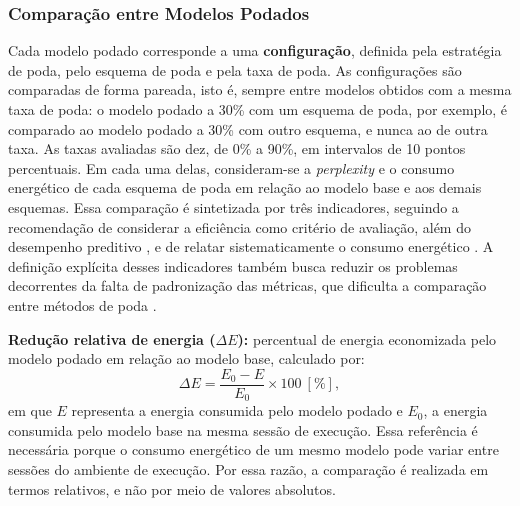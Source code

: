 \subsubsection{Comparação entre Modelos Podados}

Cada modelo podado corresponde a uma \textbf{configuração}, definida pela estratégia de
poda, pelo esquema de poda e pela taxa de poda. As
configurações são comparadas de forma pareada, isto é, sempre entre modelos obtidos com a
mesma taxa de poda: o modelo podado a 30\% com um esquema de poda, por exemplo, é comparado
ao modelo podado a 30\% com outro esquema, e nunca ao de outra taxa. As taxas avaliadas são
dez, de 0\% a 90\%, em intervalos de 10 pontos percentuais.
Em cada uma delas, consideram-se a
\textit{perplexity} e o consumo energético de cada esquema de poda em relação ao modelo base
e aos demais esquemas. Essa comparação é sintetizada por três indicadores, seguindo a
recomendação de considerar a eficiência como critério de avaliação, além do desempenho
preditivo \cite{Schwartz2020}, e de relatar sistematicamente o consumo energético
\cite{Henderson2020}. A definição explícita desses indicadores também busca reduzir os
problemas decorrentes da falta de padronização das métricas, que dificulta a comparação
entre métodos de poda \cite{Blalock2020}.

\textbf{Redução relativa de energia ($\Delta E$):} percentual de energia economizada pelo
modelo podado em relação ao modelo base, calculado por:
\begin{equation}\label{eq:delta_e}
\Delta E = \frac{E_0 - E}{E_0} \times 100\ [\%],
\end{equation}
em que $E$ representa a energia consumida pelo modelo podado e $E_0$, a energia consumida
pelo modelo base na mesma sessão de execução. Essa referência é necessária porque o consumo
energético de um mesmo modelo pode variar entre sessões do ambiente de execução. Por essa
razão, a comparação é realizada em termos relativos, e não por meio de valores absolutos.

